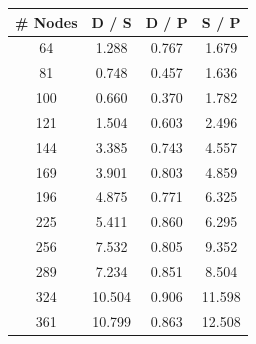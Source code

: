 \documentclass[letterpaper, 10 pt, conference]{ieeeconf}  %
\begin{document}
\begin{figure}
        \begin{minipage}[b]{.45\linewidth}
                \centering
                \begin{center}
                        \begin{tabular}{|c|c|c|c|}
                                \hline
                                \textbf{\# Nodes} & \textbf{D / S} & \textbf{D / P} & \textbf{S / P} \\ \hline
                                64                & 1.288                   & 0.767                    & 1.679                     \\ \hline
                                81                & 0.748                   & 0.457                    & 1.636                     \\ \hline
                                100               & 0.660                   & 0.370                    & 1.782                     \\ \hline
                                121               & 1.504                   & 0.603                    & 2.496                     \\ \hline
                                144               & 3.385                   & 0.743                    & 4.557                     \\ \hline
                                169               & 3.901                   & 0.803                    & 4.859                     \\ \hline
                                196               & 4.875                   & 0.771                    & 6.325                     \\ \hline
                                225               & 5.411                   & 0.860                    & 6.295                     \\ \hline
                                256               & 7.532                   & 0.805                    & 9.352                     \\ \hline
                                289               & 7.234                   & 0.851                    & 8.504                     \\ \hline
                                324               & 10.504                  & 0.906                    & 11.598                    \\ \hline
                                361               & 10.799                  & 0.863                    & 12.508                    \\ \hline

\end{tabular}
\end{center}
\end{minipage}
\end{figure}
\end{document}
